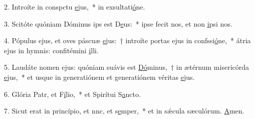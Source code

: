 2. Introíte in conspctu \uline{e}jus,~* in exsultati\uline{ó}ne.\par 
3. Scitóte quóniam Dóminus ips est D\uline{e}us:~* ipse fecit nos, et non \uline{i}psi nos.\par 
4. Pópulus ejus, et oves páscuæ \uline{e}jus:~† introíte portas ejus in confssi\uline{ó}ne,~* átria ejus in hymnis: confitémini \uline{i}lli.\par 
5. Laudáte nomen ejus: quóniam suávis est \uline{Dó}minus,~† in ætérnum misericórda \uline{e}jus,~* et usque in generatiónem et generatiónem véritas \uline{e}jus.\par 
6. Glória Patr, et F\uline{í}lio,~* et Spirítui S\uline{a}ncto.\par 
7. Sicut erat in princípio, et nnc, et s\uline{e}mper,~* et in sǽcula sæculórum. \uline{A}men.\par 
